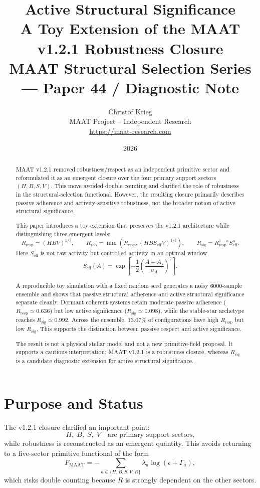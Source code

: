 \documentclass[11pt,a4paper]{article}
\title{
\textbf{Active Structural Significance}\\[0.4em]
\large A Toy Extension of the MAAT v1.2.1 Robustness Closure\\[0.3em]
\small MAAT Structural Selection Series --- Paper 44 / Diagnostic Note
}
\author{
Christof Krieg\\
\small MAAT Project -- Independent Research\\
\small \url{https://maat-research.com}
}
\date{2026}
\newcommand{\Rresp}{R_{\mathrm{resp}}}
\newcommand{\Rrob}{R_{\mathrm{rob}}}
\newcommand{\Rsig}{R_{\mathrm{sig}}}
\newcommand{\Seff}{S_{\mathrm{eff}}}
\begin{document}
\maketitle

\begin{abstract}
MAAT v1.2.1 removed robustness/respect as an independent primitive sector and
reformulated it as an emergent closure over the four primary support sectors
$(H,B,S,V)$.
This move avoided double counting and clarified the role of robustness in
the structural-selection functional.
However, the resulting closure primarily describes passive adherence and
activity-sensitive robustness, not the broader notion of active structural
significance.

This paper introduces a toy extension that preserves the v1.2.1 architecture
while distinguishing three emergent levels:
\[
\Rresp=(HBV)^{1/3},
\qquad
\Rrob=\min\!\left(\Rresp,(HB\Seff V)^{1/4}\right),
\qquad
\Rsig=\Rresp^{1-\alpha}\Seff^\alpha .
\]
Here $\Seff$ is not raw activity but controlled activity in an optimal
window,
\[
\Seff(A)=
\exp\!\left[
-\frac12
\left(\frac{A-A_\star}{\sigma_A}\right)^2
\right].
\]

A reproducible toy simulation with a fixed random seed generates a noisy
$6000$-sample ensemble and shows that passive structural adherence and active
structural significance separate cleanly.
Dormant coherent systems retain moderate passive adherence
($\Rresp\simeq0.636$) but low active significance
($\Rsig\simeq0.098$), while the stable-star archetype reaches
$\Rsig\simeq0.992$.
Across the ensemble, $13.07\%$ of configurations have high $\Rresp$ but low
$\Rsig$.
This supports the distinction between passive respect and active
significance.

The result is not a physical stellar model and not a new primitive-field
proposal.
It supports a cautious interpretation: MAAT v1.2.1 is a robustness closure,
whereas $\Rsig$ is a candidate diagnostic extension for active structural
significance.
\end{abstract}

\tableofcontents

\section{Purpose and Status}

The v1.2.1 closure clarified an important point:
\[
H,\;B,\;S,\;V
\quad\text{are primary support sectors,}
\]
while robustness is reconstructed as an emergent quantity.
This avoids returning to a five-sector primitive functional of the form
\[
F_{\mathrm{MAAT}}
=
-\sum_{a\in\{H,B,S,V,R\}}
\lambda_a\log(\epsilon+\Gamma_a),
\]
which risks double counting because $R$ is strongly dependent on the other
sectors.
\end{document}
